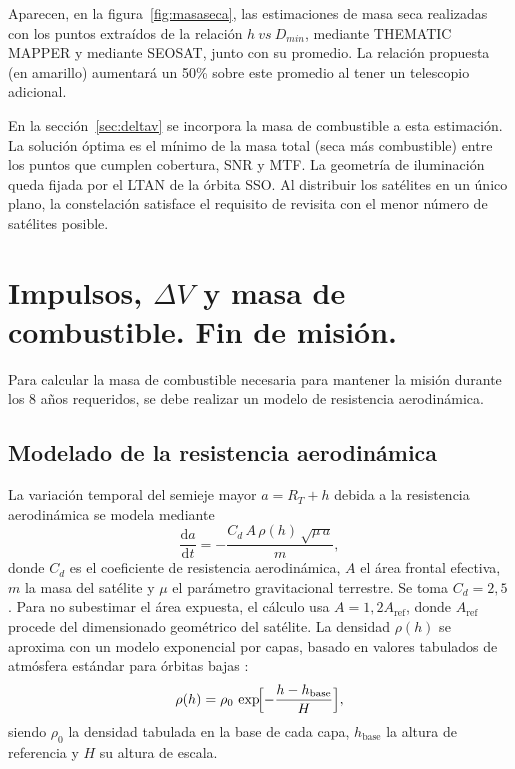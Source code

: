 Aparecen, en la figura~\ref{fig:masaseca}, las estimaciones de masa seca realizadas con los puntos extraídos de la relación $h\ vs\ D_{min}$, mediante THEMATIC MAPPER y mediante SEOSAT, junto con su promedio. La relación propuesta (en amarillo) aumentará un 50\% sobre este promedio al tener un telescopio adicional.

En la sección~\ref{sec:deltav} se incorpora la masa de combustible a esta estimación. La solución óptima es el mínimo de la masa total (seca más combustible) entre los puntos que cumplen cobertura, SNR y MTF. La geometría de iluminación queda fijada por el LTAN de la órbita SSO. Al distribuir los satélites en un único plano, la constelación satisface el requisito de revisita con el menor número de satélites posible.

\section{Impulsos, \texorpdfstring{$\Delta V$}{Delta V} y masa de combustible. Fin de misión.}

Para calcular la masa de combustible necesaria para mantener la misión durante los 8 años requeridos, se debe realizar un modelo de resistencia aerodinámica.

\subsection{Modelado de la resistencia aerodinámica}

La variación temporal del semieje mayor \(a= R_T+h\) debida a la resistencia aerodinámica se modela mediante
\begin{equation}
\frac{\mathrm d a}{\mathrm d t}=-
\frac{C_{d}\,A\,\rho(h)\,\sqrt{\mu\,a}}{m},
\label{eq:dadt}
\end{equation}
donde \(C_{d}\) es el coeficiente de resistencia aerodinámica, \(A\) el área frontal efectiva, 
\(m\) la masa del satélite y \(\mu\) el parámetro gravitacional terrestre. Se toma \(C_d = 2,5\) \cite{cook1965satellite}. Para no subestimar el área expuesta, el cálculo usa \(A=1,2 A_{\text{ref}}\), donde \(A_{\text{ref}}\) procede del dimensionado geométrico del satélite.
La densidad \(\rho(h)\) se aproxima con un modelo exponencial por capas, basado en valores tabulados de atmósfera estándar para órbitas bajas \cite{usstandardatmosphere1976,vallado2013fundamentals}:  
\begin{equation}
\rho(h)=\rho_{0}\,
\exp\!\Bigl[-\dfrac{h-h_{\text{base}}}{H}\Bigr],
\end{equation}
siendo \(\rho_{0}\) la densidad tabulada en la base de cada capa, \(h_{\text{base}}\) la altura de referencia y \(H\) su altura de escala.


